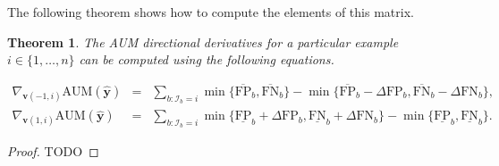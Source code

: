 \documentclass{article}
\newtheorem{theorem}{Theorem}
\begin{document}
The following theorem shows how to compute the elements of this matrix.
\begin{theorem}
\label{thm:directional-derivs}
The AUM directional derivatives for a particular example $i\in\{1,\dots,n\}$ can be computed using the following equations.
\end{theorem}
\begin{eqnarray}
  \nabla_{\mathbf v(-1,i)} \text{AUM}(\mathbf{\hat y}) &=& 
  \sum_{b: \mathcal I_b = i}
  \min\{
  \overline{\text{FP}}_b , 
  \overline{\text{FN}}_b 
  \}
  -
  \min\{
  \overline{\text{FP}}_b - \Delta\text{FP}_b, 
  \overline{\text{FN}}_b - \Delta\text{FN}_b
  \},\\
  \nabla_{\mathbf v(1,i)} \text{AUM}(\mathbf{\hat y}) &=& 
  \sum_{b: \mathcal I_b = i}
  \min\{
  \underline{\text{FP}}_b + \Delta\text{FP}_b, 
  \underline{\text{FN}}_b + \Delta\text{FN}_b
  \}
  -
  \min\{
  \underline{\text{FP}}_b , 
  \underline{\text{FN}}_b 
  \}.
\end{eqnarray}
\begin{proof}
TODO
\end{proof}
\end{document}
